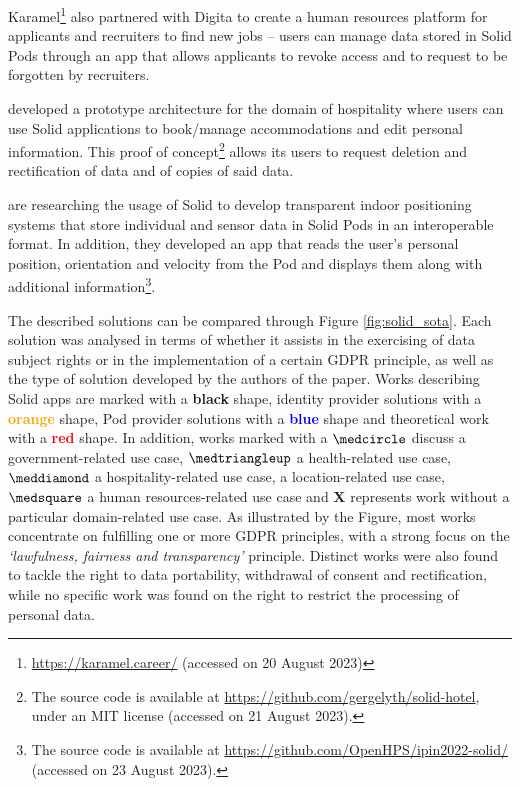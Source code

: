 Karamel\footnote{\url{https://karamel.career/} (accessed on 20 August 2023)} also partnered with Digita to create a human resources platform for applicants and recruiters to find new jobs \citep{verstraete_solid_2022} -- users can manage data stored in Solid Pods through an app that allows applicants to revoke access and to request to be forgotten by recruiters.

\cite{toth_preserving_2022} developed a prototype architecture for the domain of hospitality where users can use Solid applications to book/manage accommodations and edit personal information. This proof of concept\footnote{The source code is available at \url{https://github.com/gergelyth/solid-hotel}, under an MIT license (accessed on 21 August 2023).} allows its users to request deletion and rectification of data and of copies of said data.

\cite{van_de_wynckel_solidbased_2022} are researching the usage of Solid to develop transparent indoor positioning systems that store individual and sensor data in Solid Pods in an interoperable format. In addition, they developed an app that reads the user’s personal position, orientation and velocity from the Pod and displays them along with additional information\footnote{The source code is available at \url{https://github.com/OpenHPS/ipin2022-solid/} (accessed on 23 August 2023).}.

The described solutions can be compared through Figure \ref{fig:solid_sota}.
Each solution was analysed in terms of whether it assists in the exercising of data subject rights or in the implementation of a certain GDPR principle, as well as the type of solution developed by the authors of the paper.
Works describing Solid apps are marked with a \textbf{black} shape, identity provider solutions with a \textbf{\textcolor{orange}{orange}} shape, Pod provider solutions with a \textbf{\textcolor{blue}{blue}} shape and theoretical work with a \textbf{\textcolor{red}{red}} shape.
In addition, works marked with a $\medcircle$ discuss a government-related use case, $\medtriangleup$ a health-related use case, $\meddiamond$ a hospitality-related use case, \faStarO\space a location-related use case, $\medsquare$ a human resources-related use case and \textbf{X} represents work without a particular domain-related use case.
As illustrated by the Figure, most works concentrate on fulfilling one or more GDPR principles, with a strong focus on the \textit{`lawfulness, fairness and transparency'} principle.
Distinct works were also found to tackle the right to data portability, withdrawal of consent and rectification, while no specific work was found on the right to restrict the processing of personal data. 

